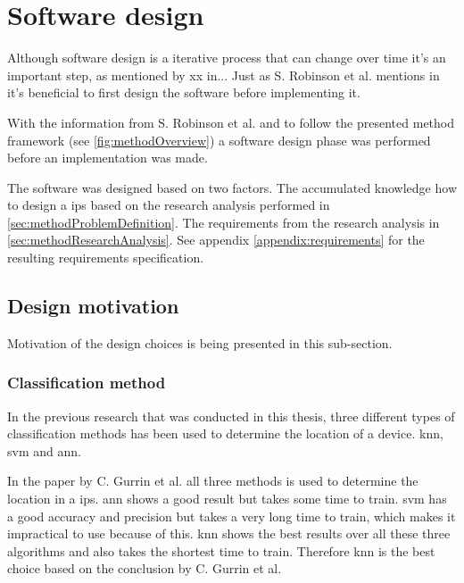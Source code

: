 \section{Software design}\label{sec:methodSoftwareDesign}
Although software design is a iterative process that can change over time it's  an important step, as mentioned by xx in...
Just as S. Robinson et al. mentions in \cite{SecretsSuccessfulSimulation1995} it's beneficial to first design the software before implementing it.
\bigskip

With the information from S. Robinson et al. and to follow the presented method framework (see \cref{fig:methodOverview}) a software design phase was performed before an implementation was made.

\bigskip

The software was designed based on two factors.
The accumulated knowledge how to design a \acrshort{ips} based on the research analysis performed in \cref{sec:methodProblemDefinition}.
The requirements from the research analysis in \cref{sec:methodResearchAnalysis}.
See appendix \ref{appendix:requirements} for the resulting requirements specification.



\subsection{Design motivation}\label{sec:methodDesignMotivation}
Motivation of the design choices is being presented in this sub-section.


\subsubsection{Classification method}\label{sec:methodSoftwareDesignClassification}
In the previous research that was conducted in this thesis, three different types of classification methods has been used to determine the location of a device.
\acrfull{knn}, \acrfull{svm} and \acrfull{ann}.  
\bigskip

In the paper \cite{ComprehensiveStudyBluetooth2013} by C. Gurrin et al. all three methods is used to determine the location in a \acrshort{ips}.
\acrshort{ann} shows a good result but takes some time to train.
\acrshort{svm} has a good accuracy and precision but takes a very long time to train, which makes it impractical to use because of this.
\acrshort{knn} shows the best results over all these three algorithms and also takes the shortest time to train.
Therefore \acrshort{knn} is the best choice based on the conclusion by C. Gurrin et al.

